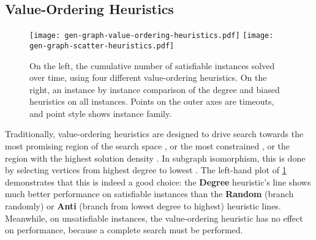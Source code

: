 \documentclass[runningheads]{llncs}
\begin{document}
\subsection{Value-Ordering Heuristics}

\begin{figure}[tb]
    \texttt{[image: gen-graph-value-ordering-heuristics.pdf]}
    \hfill
    \texttt{[image: gen-graph-scatter-heuristics.pdf]}

    \caption{On the left, the cumulative number of satisfiable instances solved over time, using
    four different value-ordering heuristics. On the right, an instance by instance comparison of
    the degree and biased heuristics on all instances. Points on the outer axes are timeouts, and
    point style shows instance family.}
    \label{figure:value-ordering-heuristics}
\end{figure}

Traditionally, value-ordering heuristics are designed to drive search towards the most promising
region of the search space \cite{DBLP:conf/ecai/Geelen92}, or the most constrained
\cite{DBLP:conf/aaai/GentMPW96}, or the region with the highest solution density
\cite{DBLP:journals/jair/PesantQZ12}. In subgraph isomorphism, this is done by selecting vertices
from highest degree to lowest \cite{DBLP:journals/jair/McCreeshPST18}. The left-hand plot of
\cref{figure:value-ordering-heuristics} demonstrates that this is indeed a good choice: the
\textbf{Degree} heuristic's line shows much better performance on satisfiable instances than the
\textbf{Random} (branch randomly) or \textbf{Anti} (branch from lowest degree to highest) heuristic
lines. Meanwhile, on unsatisfiable instances, the value-ordering heuristic has no effect on
performance, because a complete search must be performed.
\end{document}
